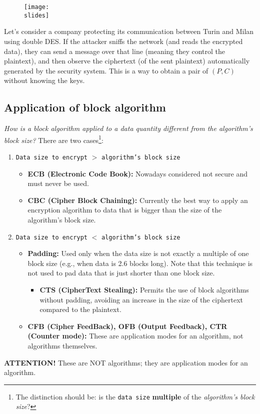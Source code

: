 \begin{figure}[h]
    \centering
    \texttt{[image: \\slides]}
\end{figure}

Let's consider a company protecting its communication between Turin and Milan using double DES. If the attacker sniffs the network (and reads the encrypted data), they can send a message over that line (meaning they control the plaintext), and then observe the ciphertext (of the sent plaintext) automatically generated by the security system.
This is a way to obtain a pair of \((P, C)\) without knowing the keys.




\newpage
\subsection{Application of block algorithm}

\textit{How is a block algorithm applied to a data quantity different from the algorithm's block size?}
There are two cases\footnote{The distinction should be: is the \texttt{data size} \textbf{multiple} of the \textit{algorithm's block size}?}:
\begin{enumerate}
    \item \texttt{Data size to encrypt} $>$ \texttt{algorithm's block size}
          \begin{itemize}
              \item \textbf{ECB (Electronic Code Book):} Nowadays considered not secure and must never be used.
              \item \textbf{CBC (Cipher Block Chaining):} Currently the best way to apply an encryption algorithm to data that is bigger than the size of the algorithm's block size.
          \end{itemize}

    \item \texttt{Data size to encrypt} $<$ \texttt{algorithm's block size}
          \begin{itemize}
              \item \textbf{Padding:} Used only when the data size is not exactly a multiple of one block size (e.g., when data is 2.6 blocks long). Note that this technique is not used to pad data that is just shorter than one block size.
                    \begin{itemize}
                        \item \textbf{CTS (CipherText Stealing):} Permits the use of block algorithms without padding, avoiding an increase in the size of the ciphertext compared to the plaintext.
                    \end{itemize}
              \item \textbf{CFB (Cipher FeedBack), OFB (Output Feedback), CTR (Counter mode):} These are application modes for an algorithm, not algorithms themselves.
          \end{itemize}
\end{enumerate}
\textbf{ATTENTION!} These are NOT algorithms; they are application modes for an algorithm.

